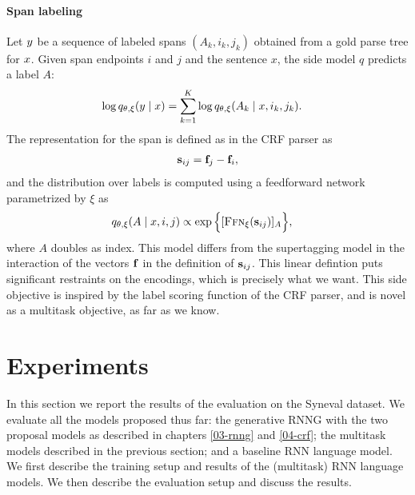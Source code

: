     \paragraph{Span labeling}
      Let $y$ be a sequence of labeled spans $(A_k, i_k, j_k)$ obtained from a gold parse tree for $x$. Given span endpoints $i$ and $j$ and the sentence $x$, the side model $q$ predicts a label $A$:
      \begin{align*}
        \log q_{\theta, \xi}(y \mid x)
          &= \sum_{k=1}^K \log q_{\theta, \xi}( A_k \mid x, i_k, j_k).
      \end{align*}
      The representation for the span is defined as in the CRF parser as
      \begin{align*}
        \mathbf{s}_{ij} = \mathbf{f}_j - \mathbf{f}_i,
      \end{align*}
      and the distribution over labels is computed using a feedforward network parametrized by $\xi$ as
      \begin{align*}
        q_{\theta, \xi}( A \mid x, i, j) &\propto \exp \Big \{ [ \textsc{Ffn}_{\xi}( \mathbf{s}_{ij} ) ]_{A} \Big\},
      \end{align*}
      where $A$ doubles as index. This model differs from the supertagging model in the interaction of the vectors $\mathbf{f}$ in the definition of $\mathbf{s}_{ij}$. This linear defintion puts significant restraints on the encodings, which is precisely what we want. This side objective is inspired by the label scoring function of the CRF parser, and is novel as a multitask objective, as far as we know.

\section{Experiments}
  In this section we report the results of the evaluation on the Syneval dataset. We evaluate all the models proposed thus far: the generative RNNG with the two proposal models as described in chapters \ref{03-rnng} and \ref{04-crf}; the multitask models described in the previous section; and a baseline RNN language model. We first describe the training setup and results of the (multitask) RNN language models. We then describe the evaluation setup and discuss the results.

